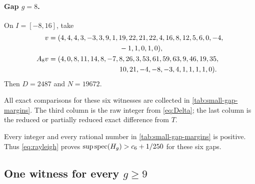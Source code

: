 \paragraph{Gap \(g=8\).}
On \(I=[-8,16]\), take
\begin{align*}
 v={}&(4,4,4,3,-3,3,9,1,19,22,21,22,4,16,8,12,5,6,0,-4,\\
 &\hspace{31mm}-1,1,0,1,0),\\
 A_8v={}&(4,0,8,11,14,8,-7,8,26,3,53,61,59,63,9,46,19,35,\\
 &\hspace{31mm}10,21,-4,-8,-3,4,1,1,1,1,0).
\end{align*}
Then \(D=2487\) and \(N=19672\).

All exact comparisons for these six witnesses are collected in
\cref{tab:small-gap-margins}.  The third column is the raw integer from
\eqref{eq:Delta}; the last column is the reduced or partially reduced exact
difference from \(T\).

\begin{table}[htbp]
\centering
\small
\caption{Exact small-gap Rayleigh comparisons.}
\label{tab:small-gap-margins}
\end{table}

Every integer and every rational number in \cref{tab:small-gap-margins} is
positive.  Thus \eqref{eq:rayleigh} proves
\(\sup\operatorname{spec}(H_g)>c_6+1/250\) for these six gaps.

\subsection{One witness for every \texorpdfstring{\(g\geq9\)}{g at least 9}}

